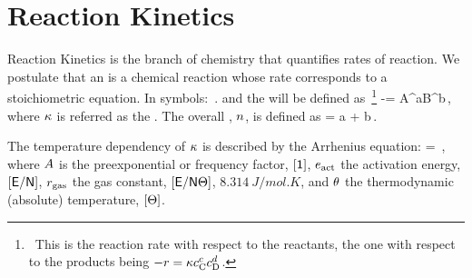 \section{Reaction Kinetics}
Reaction Kinetics is the branch of chemistry that quantifies rates of reaction. We postulate that an  is a chemical reaction whose rate corresponds to a stoichiometric equation. In symbols: 
\beq
{}\,.
\eeq
and the  will be defined as~\footnote{~This is the reaction rate with respect to the reactants, the one with respect to the products being $-\rrate = \krcoeff\conc C^c\conc D^d$.}
\beq
-\rrate = \krcoeff\conc A^a\conc B^b\,,
\eeq
where $\kappa$ is referred as the . The overall , $n$, is defined as
\beq
\rorder = a + b\,.
\eeq

The temperature dependency of $\kappa$ is described by the Arrhenius equation:
\beq
\krcoeff\vat\temp = \freqfact\exp{}\,,
\eeq
where $A$ is the preexponential or frequency factor, $[\mathsf{1}]$, $e_\text{act}$ the activation energy, $[\mathsf{E}/\mathsf{N}]$, $r_\text{gas}$ the gas constant, $[\mathsf{E}/\mathsf{N}\Theta]$, $\SI{8.314}{J/mol.K}$, and $\theta$ the thermodynamic (absolute) temperature, $[\Theta]$.

